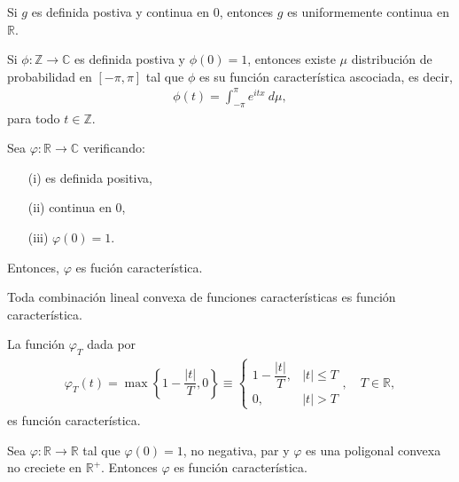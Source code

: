 \begin{teo}
    Si $g$ es definida postiva y continua en 0, entonces $g$ es uniformemente continua en $\mathbb{R}$.
\end{teo}

\begin{lema}[Herglotz]
    Si $\phi : \mathbb{Z} \longrightarrow \mathbb{C}$ es definida postiva y $\phi(0) = 1$, entonces existe $\mu$ distribución de probabilidad en $[-\pi,\pi]$ tal que $\phi$ es su función característica ascociada, es decir,
    \begin{align*}
        \phi(t) = \int_{-\pi}^{\pi} e^{itx} \ d\mu,
    \end{align*}
    para todo $t \in \mathbb{Z}$.
\end{lema}

\begin{teo}[Bochner]
    Sea $\varphi : \mathbb{R} \longrightarrow \mathbb{C}$ verificando:
    \begin{enumerate}
        \item[(i)] es definida positiva,
        \item[(ii)] continua en 0,
        \item[(iii)] $\varphi(0) = 1$.
    \end{enumerate}
    Entonces, $\varphi$ es fución característica.
\end{teo}

\begin{cor}
    Toda combinación lineal convexa de funciones características es función característica.
\end{cor}

\begin{prop}
    La función $\varphi_T$ dada por
    \begin{align*}
        \varphi_T(t) = \max \left\{ 1 - \dfrac{|t|}{T},0 \right\} \equiv \begin{cases}
                                                                             1 - \dfrac{|t|}{T}, & |t| \leq T \\
                                                                             0,                  & |t| > T
                                                                         \end{cases}, \quad T \in \mathbb{R},
    \end{align*}
    es función característica.
\end{prop}

\begin{lema}
    Sea $\varphi : \mathbb{R} \longrightarrow \mathbb{R}$ tal que $\varphi(0) = 1$, no negativa, par y $\varphi$ es una poligonal convexa no creciete en $\mathbb{R}^+$. Entonces $\varphi$ es función característica.
\end{lema}


